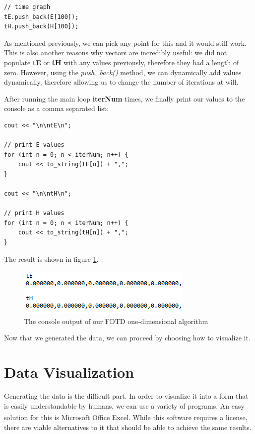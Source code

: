 \begin{verbatim}
// time graph
tE.push_back(E[100]);
tH.push_back(H[100]);
\end{verbatim}

As mentioned previously, we can pick any point for this and it would still work. This is also another reasons why vectors are incredibly useful: we did not populate \textbf{tE} or \textbf{tH} with any values previously, therefore they had a length of zero. However, using the \textit{push\_back()} method, we can dynamically add values dynamically, therefore allowing us to change the number of iterations at will. 

After running the main loop \textbf{iterNum} times, we finally print our values to the console as a comma separated list:

\begin{verbatim}
cout << "\n\ntE\n";

// print E values
for (int n = 0; n < iterNum; n++) {
	cout << to_string(tE[n]) + ",";
}

cout << "\n\ntH\n";

// print H values
for (int n = 0; n < iterNum; n++) {
	cout << to_string(tH[n]) + ",";
}
\end{verbatim}

The result is shown in figure \ref{fig:fdtd1dconsole}.

\begin{figure}[h!]
	\centering
	\includegraphics{Figures/fdtd1dconsole}
	\decoRule
	\caption[1D Console Output]{The console output of our FDTD one-dimensional algorithm}
	\label{fig:fdtd1dconsole}
\end{figure}

Now that we generated the data, we can proceed by choosing how to visualize it.

\section{Data Visualization}

Generating the data is the difficult part. In order to visualize it into a form that is easily understandable by humans, we can use a variety of programs. An easy solution for this is Microsoft Office Excel\textsuperscript{\cite{excel}}. While this software requires a license, there are viable alternatives to it that should be able to achieve the same results.

